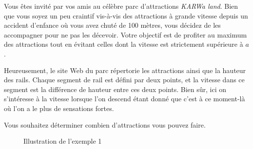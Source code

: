 \problemname{\problemyamlname}


Vous êtes invité par vos amis au célèbre parc d'attractions \textit{KARWa land}. Bien que vous soyez un peu craintif vis-à-vis des attractions à grande vitesse depuis un accident d'enfance où vous avez chuté de 100 mètres, vous décidez de les accompagner pour ne pas les décevoir. Votre objectif est de profiter au maximum des attractions tout en évitant celles dont la vitesse est strictement supérieure à $a$.

Heureusement, le site Web du parc répertorie les attractions ainsi que la hauteur des rails. Chaque segment de rail est défini par deux points, et la vitesse dans ce segment est la différence de hauteur entre ces deux points. Bien sûr, ici on s'intéresse à la vitesse lorsque l'on descend étant donné que c'est à ce moment-là où l'on a le plus de sensations fortes.

Vous souhaitez déterminer combien d'attractions vous pouvez faire.

\begin{figure}[h]
    \centering
    \caption{Illustration de l'exemple 1}
\end{figure}

